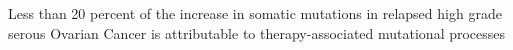 Less than 20 percent of the increase in somatic mutations in relapsed high grade serous Ovarian Cancer is attributable to therapy-associated mutational processes
